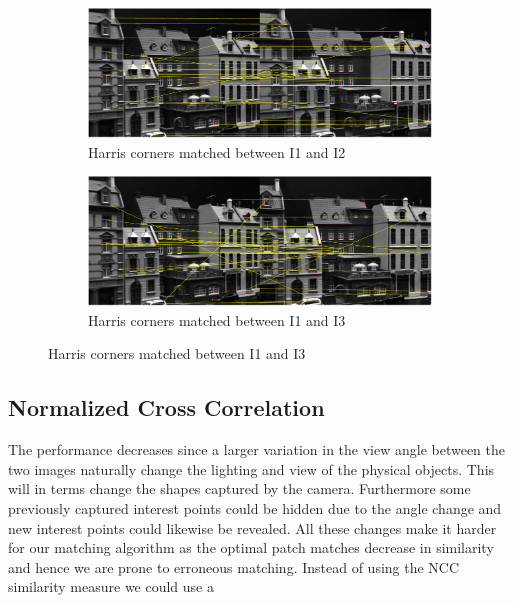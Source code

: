 \documentclass[11pt,a4paper]{article}
\begin{document}
\begin{figure}[H]
    \begin{subfigure}[t]{\textwidth}
        \includegraphics[width=\textwidth]{images/match_i1_i2_harris.pdf}
        \caption{Harris corners matched between I1 and I2}
        \label{fig:i1_i2_harris}
    \end{subfigure}
    \begin{subfigure}[t]{\textwidth}
        \includegraphics[width=\textwidth]{images/match_i1_i3_harris.pdf}
        \caption{Harris corners matched between I1 and I3}
        \label{fig:i1_i3_harris}
    \end{subfigure}
\end{figure}

\subsection{Normalized Cross Correlation}

The performance decreases since a larger variation in the view angle between
the two images naturally change the lighting and view of the physical objects.
This will in terms change the shapes captured by the camera. Furthermore some
previously captured interest points could be hidden due to the angle change
and new interest points could likewise be revealed. All these changes make it
harder for our matching algorithm as the optimal patch matches decrease in
similarity and hence we are prone to erroneous matching. Instead of using the
NCC similarity measure we could use a
\end{document}
